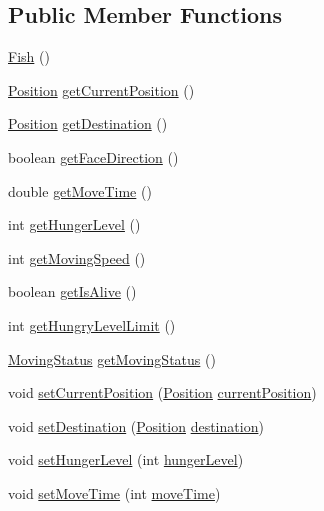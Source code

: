 \subsection*{Public Member Functions}
\begin{DoxyCompactItemize}
\item 
\mbox{\hyperlink{class_fish_ae9ad0ceab4b720f2c37a4fd4693bdd2f}{Fish}} ()
\item 
\mbox{\hyperlink{class_position}{Position}} \mbox{\hyperlink{class_fish_afc0c0824c91f3bbb61fc3762b08d9137}{get\+Current\+Position}} ()
\item 
\mbox{\hyperlink{class_position}{Position}} \mbox{\hyperlink{class_fish_a39feef3e603de6ea5931ada8b3e1e27d}{get\+Destination}} ()
\item 
boolean \mbox{\hyperlink{class_fish_a5ed789451c5b7fc9808de4837f06eb02}{get\+Face\+Direction}} ()
\item 
double \mbox{\hyperlink{class_fish_a9e32f70d5f02b4d0fb7e5f0e92e9bf4e}{get\+Move\+Time}} ()
\item 
int \mbox{\hyperlink{class_fish_a6b0fb4a552039ab06338470584bd838b}{get\+Hunger\+Level}} ()
\item 
int \mbox{\hyperlink{class_fish_a256fe3bcc998d4d668e8917e8a453e7a}{get\+Moving\+Speed}} ()
\item 
boolean \mbox{\hyperlink{class_fish_a8c7a1a1666af0c425a9ef0e83d33779c}{get\+Is\+Alive}} ()
\item 
int \mbox{\hyperlink{class_fish_aa121fc4335ac49aa48e4ef9e137c0e8b}{get\+Hungry\+Level\+Limit}} ()
\item 
\mbox{\hyperlink{enum_moving_object_1_1_moving_status}{Moving\+Status}} \mbox{\hyperlink{class_fish_a5abbd7e198b7770b666a85c5b02f6501}{get\+Moving\+Status}} ()
\item 
void \mbox{\hyperlink{class_fish_ab86ec00d2b503f310f1c29bc9a94fbd7}{set\+Current\+Position}} (\mbox{\hyperlink{class_position}{Position}} \mbox{\hyperlink{class_fish_a1f025627baa1802f78dab5fef88b7838}{current\+Position}})
\item 
void \mbox{\hyperlink{class_fish_a9b74ce69e55149c7df9f70e83ce5b66b}{set\+Destination}} (\mbox{\hyperlink{class_position}{Position}} \mbox{\hyperlink{class_fish_a93523126df751dd0301a1fcf2ed42735}{destination}})
\item 
void \mbox{\hyperlink{class_fish_a95e9975f718a7a24254bcbb58dfe1ba1}{set\+Hunger\+Level}} (int \mbox{\hyperlink{class_fish_a9e0224f04ab5b9da07414075698bbbf1}{hunger\+Level}})
\item 
void \mbox{\hyperlink{class_fish_ad6d23a97f4d4f6916243cf0033470e87}{set\+Move\+Time}} (int \mbox{\hyperlink{class_fish_a630f9859f38f851ccdf223daebebd27f}{move\+Time}})

\end{DoxyCompactItemize}
